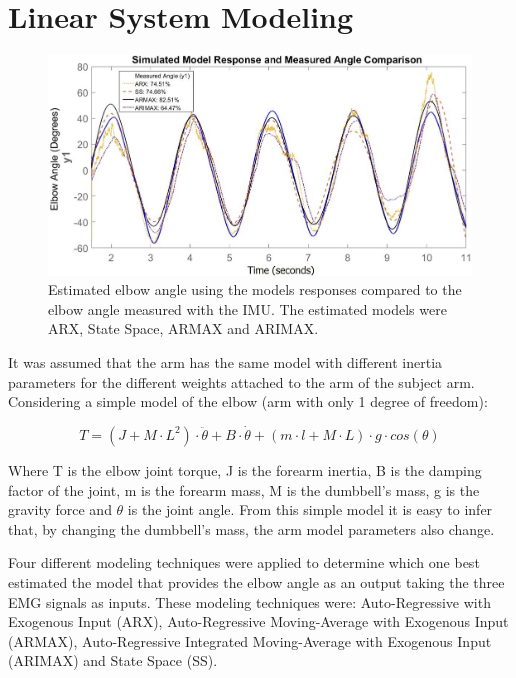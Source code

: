 \section{Linear System Modeling}

\begin{figure}[thpb]
      \centering
      \includegraphics[scale=0.5]{Images/Models_comparison_5.jpg}
      \caption{Estimated elbow angle using the models responses compared to the elbow angle measured with the IMU. The estimated models were ARX, State Space, ARMAX and ARIMAX.}
      \label{Models Comparison}
   \end{figure}

It was assumed that the arm has the same model with different inertia parameters for the different weights attached to the arm of the subject arm. Considering a simple model of the elbow (arm with only 1 degree of freedom): 

\begin{equation}\label{eq:simpleModel}
T = (J + M\cdot L^2)\cdot \ddot{\theta}  + B \cdot \dot{\theta}  + (m\cdot l + M \cdot L) \cdot g \cdot cos(\theta)
\end{equation}


Where T is the elbow joint torque, J is the forearm inertia, B is the damping factor of the joint, m is the forearm mass, M is the dumbbell's mass, g is the gravity force and \(\theta\) is the joint angle. From this simple model it is easy to infer that, by changing the dumbbell's mass, the arm model parameters also change.

Four different modeling techniques were applied to determine which one best estimated the model that provides the elbow angle as an output taking the three EMG signals as inputs. These modeling techniques were: Auto-Regressive with Exogenous Input (ARX), Auto-Regressive Moving-Average with Exogenous Input (ARMAX), Auto-Regressive Integrated Moving-Average with Exogenous Input (ARIMAX) and State Space (SS).

